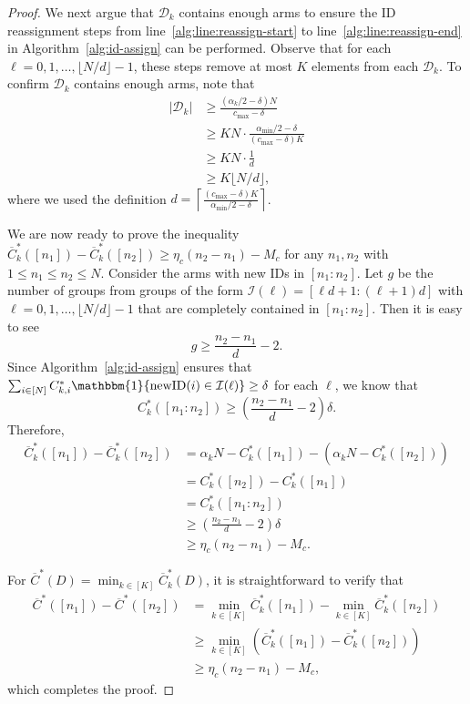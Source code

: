 \documentclass{article}
\theoremstyle{plain}
\theoremstyle{remark}
\newcommand{\abs}[1]{\left\lvert#1\right\rvert}
\newcommand{\newID}{\text{newID}}
\newcommand{\rembud}{\overline{C}^*} %
\newcommand{\costIDreassign}{\delta} %
\newcommand{\gsizeIDreassign}{d} %
\newcommand{\cI}{\mathcal{I}}
\newcommand{\cD}{\mathcal{D}}
\begin{document}
\begin{proof}
We next argue that $\cD_k$ contains enough arms to ensure the ID reassignment steps from line~\ref{alg:line:reassign-start} to line~\ref{alg:line:reassign-end} in Algorithm~\ref{alg:id-assign} can be performed.
Observe that for each $\ell = 0,1,\dots,\lfloor N/ \gsizeIDreassign\rfloor -1$, these steps remove at most $K$ elements from each $\cD_k$.
To confirm $\cD_k$ contains enough arms, note that
\begin{align*}
    \abs{\cD_k}&\geq \frac{(\alpha_k/2-\costIDreassign)N}{c_{\max}-\costIDreassign}\\
    &\ge KN\cdot \frac{\alpha_{\min}/2-\costIDreassign}{(c_{\max}-\costIDreassign)K}\\
    &\ge KN\cdot\frac{1}{\gsizeIDreassign}\\
    &\ge K\lfloor N/\gsizeIDreassign\rfloor,
\end{align*}
where we used the definition $\gsizeIDreassign = \left\lceil \frac{(c_{\max}-\costIDreassign)K}{\alpha_{\min}/2-\costIDreassign}\right\rceil$.


We are now ready to prove the inequality $\rembud_k([n_1])-\rembud_k([n_2])\ge \eta_c(n_2-n_1)-M_c$ for any $n_1,n_2$ with $1\le n_1\le n_2\le N$.
Consider the arms with new IDs in $[n_1:n_2]$.
Let $g$ be the number of groups from groups of the form $\cI(\ell)=[\ell \gsizeIDreassign+1:(\ell+1)\gsizeIDreassign]$ with $\ell=0,1,\dots,\lfloor N/\gsizeIDreassign\rfloor -1$ that are completely contained in $[n_1:n_2]$.
Then it is easy to see
\begin{equation*}
    g \ge \frac{n_2-n_1}{\gsizeIDreassign}-2.
\end{equation*}
Since Algorithm~\ref{alg:id-assign} ensures that $\sum_{i\in[N]}C_{k,i}^*\mathbbm{1}\{\newID(i)\in \cI(\ell)\}\ge \costIDreassign$ for each $\ell$, we know that
\begin{equation*}
    C_k^*([n_1:n_2])\ge \left(\frac{n_2-n_1}{\gsizeIDreassign}-2\right)\costIDreassign.
\end{equation*}
Therefore,
\begin{align*}
    \rembud_k([n_1])-\rembud_k([n_2]) & = \alpha_k N-C_k^*([n_1])-(\alpha_k N-C_k^*([n_2]))\\
    &=C_k^*([n_2])-C_k^*([n_1])\\
    &=C_k^*([n_1:n_2])\\
    &\ge \left(\frac{n_2-n_1}{\gsizeIDreassign}-2\right)\costIDreassign\\
    &\ge \eta_c(n_2-n_1)-M_c.
\end{align*}

For $\rembud(D)=\min_{k\in[K]}\rembud_k(D)$, it is straightforward to verify that
\begin{align*}
    \rembud([n_1])-\rembud([n_2]) &= \min_{k\in[K]}\rembud_k([n_1]) - \min_{k\in[K]}\rembud_k([n_2])\\
    &\ge \min_{k\in[K]}\left(\rembud_k([n_1]) - \rembud_k([n_2])\right)\\
    &\ge \eta_c(n_2-n_1)-M_c,
\end{align*}
which completes the proof.
\end{proof}
\end{document}

